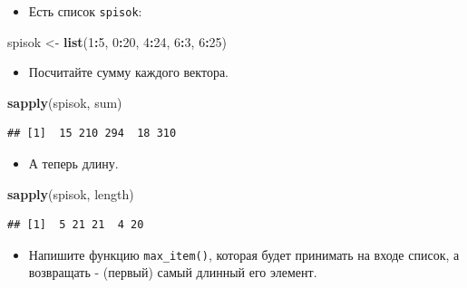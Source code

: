 \documentclass[]{book}
\newenvironment{Shaded}{\begin{snugshade}}{\end{snugshade}}
\newcommand{\KeywordTok}[1]{\textcolor[rgb]{0.13,0.29,0.53}{\textbf{#1}}}
\newcommand{\DecValTok}[1]{\textcolor[rgb]{0.00,0.00,0.81}{#1}}
\newcommand{\StringTok}[1]{\textcolor[rgb]{0.31,0.60,0.02}{#1}}
\newcommand{\OperatorTok}[1]{\textcolor[rgb]{0.81,0.36,0.00}{\textbf{#1}}}
\newcommand{\NormalTok}[1]{#1}
\providecommand{\tightlist}{%
  \setlength{\itemsep}{0pt}\setlength{\parskip}{0pt}}
\begin{document}
\begin{itemize}
\tightlist
\item
  Есть список \texttt{spisok}:
\end{itemize}

\begin{Shaded}
\begin{Highlighting}[]
\NormalTok{spisok <-}\StringTok{ }\KeywordTok{list}\NormalTok{(}\DecValTok{1}\OperatorTok{:}\DecValTok{5}\NormalTok{, }\DecValTok{0}\OperatorTok{:}\DecValTok{20}\NormalTok{, }\DecValTok{4}\OperatorTok{:}\DecValTok{24}\NormalTok{, }\DecValTok{6}\OperatorTok{:}\DecValTok{3}\NormalTok{, }\DecValTok{6}\OperatorTok{:}\DecValTok{25}\NormalTok{)}
\end{Highlighting}
\end{Shaded}

\begin{itemize}
\tightlist
\item
  Посчитайте сумму каждого вектора.
\end{itemize}

\begin{Shaded}
\begin{Highlighting}[]
\KeywordTok{sapply}\NormalTok{(spisok, sum)}
\end{Highlighting}
\end{Shaded}

\begin{verbatim}
## [1]  15 210 294  18 310
\end{verbatim}

\begin{itemize}
\tightlist
\item
  А теперь длину.
\end{itemize}

\begin{Shaded}
\begin{Highlighting}[]
\KeywordTok{sapply}\NormalTok{(spisok, length)}
\end{Highlighting}
\end{Shaded}

\begin{verbatim}
## [1]  5 21 21  4 20
\end{verbatim}

\begin{itemize}
\tightlist
\item
  Напишите функцию \texttt{max\_item()}, которая будет принимать на
  входе список, а возвращать - (первый) самый длинный его элемент.
\end{itemize}
\end{document}
